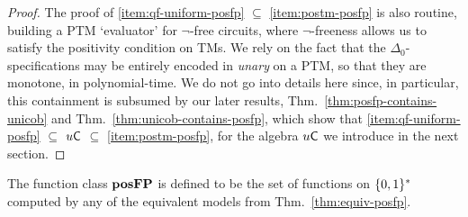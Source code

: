 \documentclass{lmcs}
\begin{document}
\begin{proof}
	
	The proof of \eqref{item:qf-uniform-posfp} $\subseteq $ \eqref{item:postm-posfp} is also routine, building a PTM `evaluator' for $\neg$-free circuits, where $\neg$-freeness allows us to satisfy the positivity condition on TMs. 
	We rely on the fact that the $\Delta_0$-specifications may be entirely encoded in \emph{unary} on a PTM, so that they are monotone, in polynomial-time.
	We do not go into details here since, in particular, this containment is subsumed by our later results, Thm.~\ref{thm:posfp-contains-unicob} and Thm.~\ref{thm:unicob-contains-posfp}, which show that \eqref{item:qf-uniform-posfp} $\subseteq$ $u \mathsf{C}$ $\subseteq$ \eqref{item:postm-posfp}, for the algebra $u \mathsf{C}$ we introduce in the next section.
%	
%		
%	
%	
\end{proof}

\begin{definition}
	The function class $\mathbf{pos}\mathbf{FP}$ is defined to be the set of functions on $\{0,1\}^*$ computed by any of the equivalent models from Thm.~\ref{thm:equiv-posfp}.
	
\end{definition}
\end{document}
